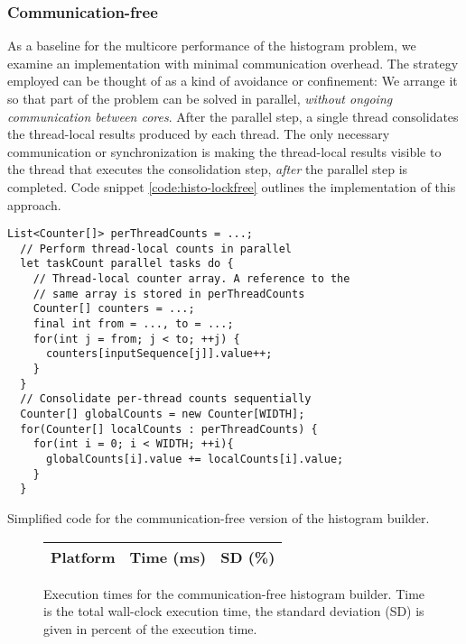 \subsubsection{Communication-free}
As a baseline for the multicore performance of the histogram problem, we examine
an implementation with minimal communication overhead. The strategy employed can
be thought of as a kind of avoidance or confinement: We arrange it so that part
of the problem can be solved in parallel, \textit{without ongoing communication
between cores}. After the parallel step, a single thread consolidates the
thread-local results produced by each thread. The only necessary communication
or synchronization is making the thread-local results visible to the thread that
executes the consolidation step, \textit{after} the parallel step is completed.
Code snippet \ref{code:histo-lockfree} outlines the implementation of this
approach.

\begin{code}
\begin{Verbatim}[frame=single]
  List<Counter[]> perThreadCounts = ...;
  // Perform thread-local counts in parallel
  let taskCount parallel tasks do {
    // Thread-local counter array. A reference to the
    // same array is stored in perThreadCounts
    Counter[] counters = ...;
    final int from = ..., to = ...;
    for(int j = from; j < to; ++j) {
      counters[inputSequence[j]].value++;
    }
  }
  // Consolidate per-thread counts sequentially
  Counter[] globalCounts = new Counter[WIDTH];
  for(Counter[] localCounts : perThreadCounts) {
    for(int i = 0; i < WIDTH; ++i){
      globalCounts[i].value += localCounts[i].value;
    }
  }
\end{Verbatim}
	\caption{Simplified code for the communication-free version of the
	histogram builder.}
	\label{code:histo-lockfree}
\end{code}

\begin{figure}[hbtp]
	\centering
	\begin{tabular}{l r r}
		\hline
		\hline
		Platform & Time (ms) & SD (\%) \\
		\hline
		
		\hline
		\hline
	\end{tabular}
	\caption{Execution times for the communication-free histogram builder. Time
is the total wall-clock execution time, the standard deviation (SD) is given in
percent of the execution time.} \label{table:histo-lockfree}
\end{figure}

